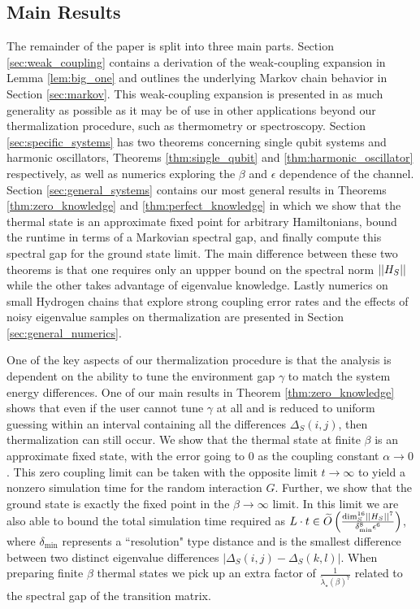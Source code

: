\subsection{Main Results}
The remainder of the paper is split into three main parts. Section \ref{sec:weak_coupling} contains a derivation of the weak-coupling expansion in Lemma \ref{lem:big_one} and outlines the underlying Markov chain behavior in Section \ref{sec:markov}. This weak-coupling expansion is presented in as much generality as possible as it may be of use in other applications beyond our thermalization procedure, such as thermometry or spectroscopy. Section \ref{sec:specific_systems} has two theorems concerning single qubit systems and harmonic oscillators, Theorems \ref{thm:single_qubit} and \ref{thm:harmonic_oscillator} respectively, as well as numerics exploring the $\beta$ and $\epsilon$ dependence of the channel. Section \ref{sec:general_systems} contains our most general results in Theorems \ref{thm:zero_knowledge} and \ref{thm:perfect_knowledge} in which we show that the thermal state is an approximate fixed point for arbitrary Hamiltonians, bound the runtime in terms of a Markovian spectral gap, and finally compute this spectral gap for the ground state limit. The main difference between these two theorems is that one requires only an uppper bound on the spectral norm $\left| \left| H_S \right| \right|$ while the other takes advantage of eigenvalue knowledge. Lastly numerics on small Hydrogen chains that explore strong coupling error rates and the effects of noisy eigenvalue samples on thermalization are presented in Section \ref{sec:general_numerics}. 

One of the key aspects of our thermalization procedure is that the analysis is dependent on the ability to tune the environment gap $\gamma$ to match the system energy differences. One of our main results in Theorem \ref{thm:zero_knowledge} shows that even if the user cannot tune $\gamma$ at all and is reduced to uniform guessing within an interval containing all the differences $\Delta_S(i,j)$, then thermalization can still occur. We show that the thermal state at finite $\beta$ is an approximate fixed state, with the error going to 0 as the coupling constant $\alpha \to 0$. This zero coupling limit can be taken with the opposite limit $t \to \infty$ to yield a nonzero simulation time for the random interaction $G$. Further, we show that the ground state is exactly the fixed point in the $\beta \to \infty$ limit. In this limit we are also able to bound the total simulation time required as $L \cdot t \in \widetilde{O} \left( \frac{\dim_S^{16} \left| \left| H_S \right| \right|^7}{\delta_{\min}^8 \epsilon^6} \right) $, where $\delta_{\min}$ represents a ``resolution" type distance and is the smallest difference between two distinct eigenvalue differences $|\Delta_S(i,j) - \Delta_S(k,l)|$. When preparing finite $\beta$ thermal states we pick up an extra factor of $\frac{1}{\widetilde{\lambda}_\star(\beta)^7}$ related to the spectral gap of the transition matrix.

